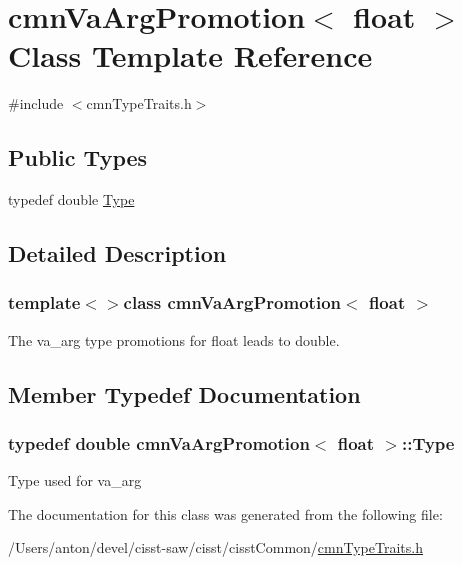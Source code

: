 \hypertarget{classcmn_va_arg_promotion_3_01float_01_4}{}\section{cmn\+Va\+Arg\+Promotion$<$ float $>$ Class Template Reference}
\label{classcmn_va_arg_promotion_3_01float_01_4}


{\ttfamily \#include $<$cmn\+Type\+Traits.\+h$>$}

\subsection*{Public Types}
\begin{DoxyCompactItemize}
\item 
typedef double \hyperlink{classcmn_va_arg_promotion_3_01float_01_4_aad7fc5d5fe18edf744594e8f7bef887c}{Type}
\end{DoxyCompactItemize}


\subsection{Detailed Description}
\subsubsection*{template$<$$>$class cmn\+Va\+Arg\+Promotion$<$ float $>$}

The va\+\_\+arg type promotions for float leads to double. 

\subsection{Member Typedef Documentation}
\hypertarget{classcmn_va_arg_promotion_3_01float_01_4_aad7fc5d5fe18edf744594e8f7bef887c}{}
\subsubsection[{Type}]{\setlength{\rightskip}{0pt plus 5cm}typedef double {\bf cmn\+Va\+Arg\+Promotion}$<$ float $>$\+::{\bf Type}}\label{classcmn_va_arg_promotion_3_01float_01_4_aad7fc5d5fe18edf744594e8f7bef887c}
Type used for va\+\_\+arg 

The documentation for this class was generated from the following file\+:\begin{DoxyCompactItemize}
\item 
/\+Users/anton/devel/cisst-\/saw/cisst/cisst\+Common/\hyperlink{cmn_type_traits_8h}{cmn\+Type\+Traits.\+h}\end{DoxyCompactItemize}
